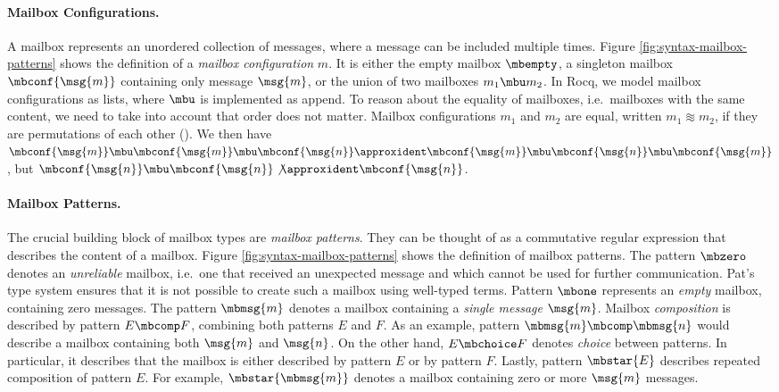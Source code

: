 \paragraph{Mailbox Configurations.}
A mailbox represents an unordered collection of messages, where a message can be included multiple times.
Figure \ref{fig:syntax-mailbox-patterns} shows the definition of a \emph{mailbox configuration} $m$.
It is either the empty mailbox $\mbempty$, a singleton mailbox $\mbconf{\msg{m}}$ containing only message $\msg{m}$, or the union of two mailboxes $m_1 \mbu m_2$.
In Rocq, we model mailbox configurations as lists, where $\mbu$ is implemented as append.
To reason about the equality of mailboxes, i.e.\ mailboxes with the same content, we need to take into account that order does not matter.
Mailbox configurations $m_1$ and $m_2$ are equal, written $m_1 \approxident m_2$, if they are permutations of each other ().
We then have $\mbconf{\msg{m}} \mbu \mbconf{\msg{m}} \mbu \mbconf{\msg{n}} \approxident \mbconf{\msg{m}} \mbu \mbconf{\msg{n}} \mbu \mbconf{\msg{m}}$,
but $\mbconf{\msg{n}} \mbu \mbconf{\msg{n}} \not\approxident \mbconf{\msg{n}}$.


\paragraph{Mailbox Patterns.}
The crucial building block of mailbox types are \emph{mailbox patterns}.
They can be thought of as a commutative regular expression that describes the content of a mailbox.
Figure \ref{fig:syntax-mailbox-patterns} shows the definition of mailbox patterns.
The pattern $\mbzero$ denotes an \emph{unreliable} mailbox, i.e.\ one that
received an unexpected message and which cannot be used for further
communication.  Pat's type system ensures that it is not possible to create such
a mailbox using well-typed terms.
%
Pattern $\mbone$ represents an \emph{empty} mailbox, containing zero messages.
%
The pattern $\mbmsg{m}$ denotes a mailbox containing a \emph{single message} $\msg{m}$.
Mailbox \emph{composition} is described by pattern $E \mbcomp F$, combining both patterns $E$ and $F$.
As an example, pattern $\mbmsg{m} \mbcomp \mbmsg{n}$ would describe a mailbox containing both $\msg{m}$ and $\msg{n}$.
%
On the other hand, $E \mbchoice F$ denotes \emph{choice} between patterns.
In particular, it describes that the mailbox is either described by pattern $E$ or by pattern $F$.
Lastly, pattern $\mbstar{E}$ describes repeated composition of pattern $E$.
For example, $\mbstar{\mbmsg{m}}$ denotes a mailbox containing zero or more $\msg{m}$ messages.

